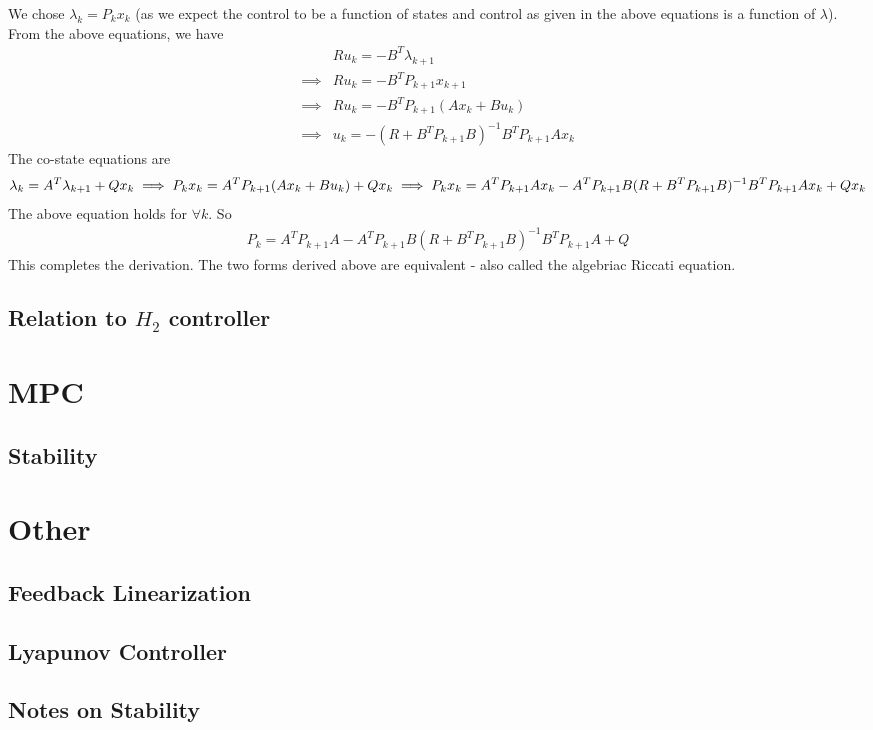 We chose $\lambda_k = P_kx_k$ (as we expect the control to be a function of states and control as given in the above equations is a function of $\lambda$).
From the above equations, we have
\begin{align}
    & Ru_k = -B^T\lambda_{k+1} \\
    \implies & Ru_k = -B^TP_{k+1}x_{k+1} \\
    \implies & Ru_k = -B^TP_{k+1}(Ax_k + Bu_k) \\
    \implies & u_k = -(R+B^TP_{k+1}B)^{-1}B^TP_{k+1}Ax_k
\end{align}
The co-state equations are
\begin{dmath}
     \lambda_{k} = A^T\lambda_{k+1} + Qx_k
     \implies  P_kx_k = A^TP_{k+1}(Ax_k+Bu_k) + Qx_k \\
     \implies  P_kx_k = A^TP_{k+1}Ax_k - A^TP_{k+1}B(R+B^TP_{k+1}B)^{-1}B^TP_{k+1}Ax_k + Qx_k
\end{dmath}
The above equation holds for $\forall k$.
So
\begin{align}
     P_k = A^TP_{k+1}A - A^TP_{k+1}B(R+B^TP_{k+1}B)^{-1}B^TP_{k+1}A + Q
\end{align}
This completes the derivation. The two forms derived above are equivalent  - also called the algebriac Riccati equation.
\subsection{Relation to $H_2$ controller}
\section{MPC}
\subsection{Stability}
\section{Other}
\subsection{Feedback Linearization}
\subsection{Lyapunov Controller}
\subsection{Notes on Stability}